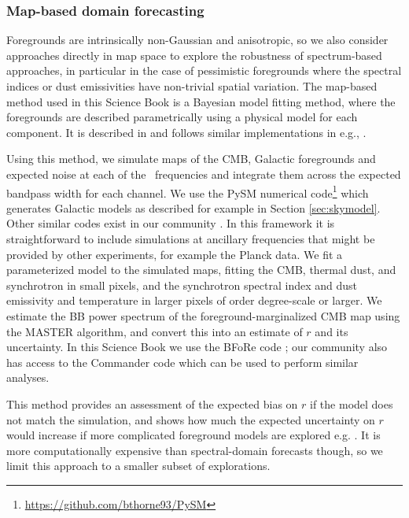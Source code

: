 \subsubsection{Map-based domain forecasting}

Foregrounds are intrinsically non-Gaussian and anisotropic, so we also consider approaches directly in map space to explore the robustness of spectrum-based approaches, in particular in the case of pessimistic foregrounds where the spectral indices or dust emissivities have non-trivial spatial variation. The map-based method used in this Science Book is a Bayesian model fitting method, where the foregrounds are described parametrically using a physical model for each component. It is described in \cite{Alonso:prep} and follows similar implementations in e.g., \cite{Eriksen:2005dr}.

Using this method, we simulate maps of the CMB, Galactic foregrounds and expected noise at each of the \cmbexp\ frequencies and integrate them across the expected bandpass width for each channel. We use the PySM numerical code\footnote{\url{https://github.com/bthorne93/PySM}} which generates Galactic models as described for example in Section \ref{sec:skymodel}. Other similar codes exist in our community \cite{Delabrouille:2012ye}. In this framework it is straightforward to include simulations at ancillary frequencies that might be provided by other experiments, for example the Planck data. We fit a parameterized model to the simulated maps, fitting the CMB, thermal dust, and synchrotron in small pixels, and the synchrotron spectral index and dust emissivity and temperature in larger pixels of order degree-scale or larger. We estimate the BB power spectrum of the foreground-marginalized CMB map using the MASTER \cite{Hivon:2001jp} algorithm, and convert this into an estimate of $r$ and its uncertainty. In this Science Book we use the BFoRe code \cite{Alonso:prep}; our community also has access to the Commander code which can be used to perform similar analyses.

This method provides an assessment of the expected bias on $r$ if the model does not match the simulation, and shows how much the expected uncertainty on $r$ would increase if more complicated foreground models are explored e.g. \cite{ArmitageCaplan:2011sn,Remazeilles:2015hpa}. It is more computationally expensive than spectral-domain forecasts though, so we limit this approach to a smaller subset of explorations. 

